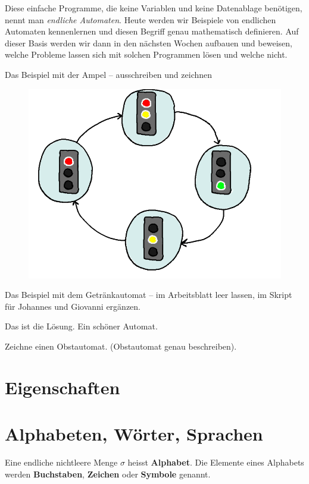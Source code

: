 \documentclass{article}
\begin{document}
Diese einfache Programme, die keine Variablen und keine Datenablage benötigen, nennt man \emph{endliche Automaten}. Heute werden wir Beispiele von endlichen Automaten kennenlernen und diesen Begriff genau mathematisch definieren. Auf dieser Basis werden wir dann in den nächsten Wochen aufbauen und beweisen, welche Probleme lassen sich mit solchen Programmen lösen und welche nicht.
\begin{example}
Das Beispiel mit der Ampel -- ausschreiben und zeichnen
\begin{figure}[H]
\centering
\includegraphics[width=\linewidth]{Pictures/Ampel.png} 
\end{figure}
\end{example}

\begin{example}
Das Beispiel mit dem Getränkautomat -- im Arbeitsblatt leer lassen, im Skript für Johannes und Giovanni ergänzen.
\end{example}

\begin{examplesolution}[print=true]
Das ist die Lösung. Ein schöner Automat.
\end{examplesolution}

\begin{question}
Zeichne einen Obstautomat. (Obstautomat genau beschreiben).
\end{question}

\section{Eigenschaften}
\section{Alphabeten, Wörter, Sprachen}
\begin{definition}
Eine endliche nichtleere Menge \(\sigma\) heisst \textbf{Alphabet}. Die Elemente eines Alphabets werden \textbf{Buchstaben}, \textbf{Zeichen} oder \textbf{Symbole} genannt.
\end{definition}
\end{document}
